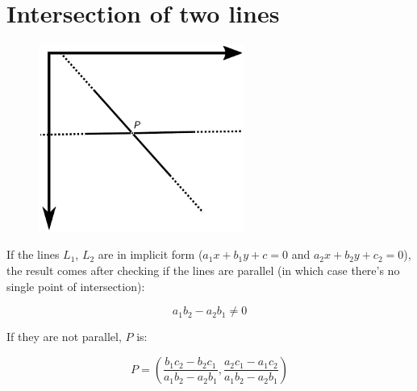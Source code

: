 \documentclass[12pt,openany,a4,usenames,dvipsnames]{book}
\begin{document}
\chapter{Intersection of two lines}\label{ch:intersection-lines}
\begin{figure}[H]
\centering
\includegraphics[width=0.6\textwidth,keepaspectratio]{figures/intersection_lines.pdf}
\end{figure}
If the lines $L_1$, $L_2$ are in implicit form ($a_1x+b_1y+c=0$ and $a_2x+b_2y+c_2=0$), the result comes after checking if the lines are parallel (in which case there's no single point of intersection):

$$a_1b_2-a_2b_1 \neq{} 0$$

If they are not parallel, $P$ is:

$$P = \left(\frac{b_1c_2-b_2c_1}{a_1b_2-a_2b_1}, \frac{a_2c_1-a_1c_2}{a_1b_2-a_2b_1}\right)$$
\end{document}
